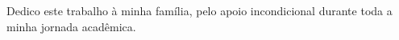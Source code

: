 
\renewcommand{\dedicatorianame}{DEDICATÓRIA}

\clearpage
\begin{dedicatoria}

Dedico este trabalho à minha família, pelo apoio incondicional durante toda a minha jornada acadêmica.

\end{dedicatoria}
\clearpage
